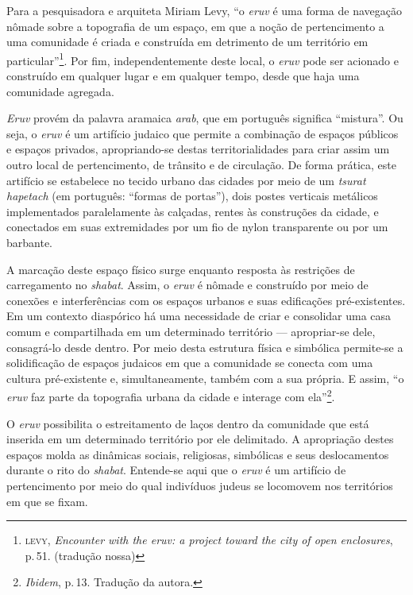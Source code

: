 Para a pesquisadora e arquiteta Miriam Levy, ``o \emph{eruv} é uma forma
de navegação nômade sobre a topografia de um espaço, em que a noção de
pertencimento a uma comunidade é criada e construída em detrimento de um
território em particular''\footnote{\textsc{levy}, \emph{Encounter with the
  \emph{eruv}: a project toward the city of open enclosures}, p.\,51. (tradução
  nossa)}. Por fim, independentemente deste local, o \emph{eruv} pode
ser acionado e construído em qualquer lugar e em qualquer tempo, desde
que haja uma comunidade agregada.

\begin{center}\end{center}

\noindent{}\emph{Eruv} provém da palavra aramaica \emph{arab}, que em português
significa ``mistura''. Ou seja, o \emph{eruv} é um artifício judaico que
permite a combinação de espaços públicos e espaços privados,
apropriando-se destas territorialidades para criar assim um outro local
de pertencimento, de trânsito e de circulação. De forma prática, este
artifício se estabelece no tecido urbano das cidades por meio de um
\emph{tsurat hapetach} (em português: ``formas de portas''), dois postes
verticais metálicos implementados paralelamente às calçadas, rentes às
construções da cidade, e conectados em suas extremidades por um fio de
nylon transparente ou por um barbante.

A marcação deste espaço físico surge enquanto resposta às restrições de
carregamento no \emph{shabat}. Assim, o \emph{eruv} é nômade e
construído por meio de conexões e interferências com os espaços urbanos
e suas edificações pré-existentes. Em um contexto diaspórico há uma
necessidade de criar e consolidar uma casa comum e compartilhada em um
determinado território --- apropriar-se dele, consagrá-lo desde dentro.
Por meio desta estrutura física e simbólica permite-se a solidificação
de espaços judaicos em que a comunidade se conecta com uma cultura
pré-existente e, simultaneamente, também com a sua própria. E assim,
``o \emph{eruv} faz parte da topografia urbana da cidade e interage com
ela''\footnote{\emph{Ibidem}, p.\,13. Tradução da autora.}.

O \emph{eruv} possibilita o estreitamento de laços dentro da comunidade
que está inserida em um determinado território por ele delimitado. A
apropriação destes espaços molda as dinâmicas sociais, religiosas,
simbólicas e seus deslocamentos durante o rito do \emph{shabat}.
Entende-se aqui que o \emph{eruv} é um artifício de pertencimento por
meio do qual indivíduos judeus se locomovem nos territórios em que se
fixam.

